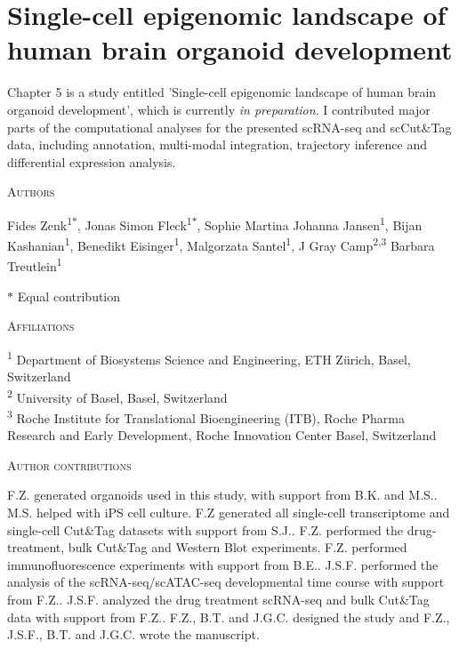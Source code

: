 \thispagestyle{plain}
\section{Single-cell epigenomic landscape of human brain organoid development}

\vspace{0.5cm}

Chapter 5 is a study entitled 'Single-cell epigenomic landscape of human brain organoid development', which is currently \textit{in preparation}. I contributed major parts of the computational analyses for the presented scRNA-seq and scCut\&Tag data, including annotation, multi-modal integration, trajectory inference and differential expression analysis.

\vspace{1cm}

\noindent
{\large\textsc{Authors}}

\noindent
Fides Zenk\textsuperscript{1$*$}, 
Jonas Simon Fleck\textsuperscript{1$*$}, 
Sophie Martina Johanna Jansen\textsuperscript{1}, 
Bijan Kashanian\textsuperscript{1}, 
Benedikt Eisinger\textsuperscript{1}, 
Malgorzata Santel\textsuperscript{1}, 
J Gray Camp\textsuperscript{2,3}
Barbara Treutlein\textsuperscript{1}

\vspace{0.5cm}

\noindent
$\ast$ Equal contribution

\vspace{1cm}

\noindent
{\large\textsc{Affiliations}}

\noindent
\textsuperscript{1} Department of Biosystems Science and Engineering, ETH Zürich, Basel, Switzerland\\
\textsuperscript{2} University of Basel, Basel, Switzerland\\
\textsuperscript{3} Roche Institute for Translational Bioengineering (ITB), Roche Pharma Research and Early Development, Roche Innovation Center Basel, Switzerland

\vspace{1cm}

\noindent
{\large\textsc{Author contributions}}

\noindent
F.Z. generated organoids used in this study, with support from B.K. and M.S.. M.S. helped with iPS cell culture. F.Z generated all single-cell transcriptome and single-cell Cut\&Tag datasets with support from S.J.. F.Z. performed the drug-treatment, bulk Cut\&Tag and Western Blot experiments. F.Z. performed immunofluorescence experiments with support from B.E.. J.S.F. performed the analysis of the scRNA-seq/scATAC-seq developmental time course with support from F.Z.. J.S.F. analyzed the drug treatment scRNA-seq and bulk Cut\&Tag data with support from F.Z.. F.Z., B.T. and J.G.C. designed the study and F.Z., J.S.F., B.T. and J.G.C. wrote the manuscript.

